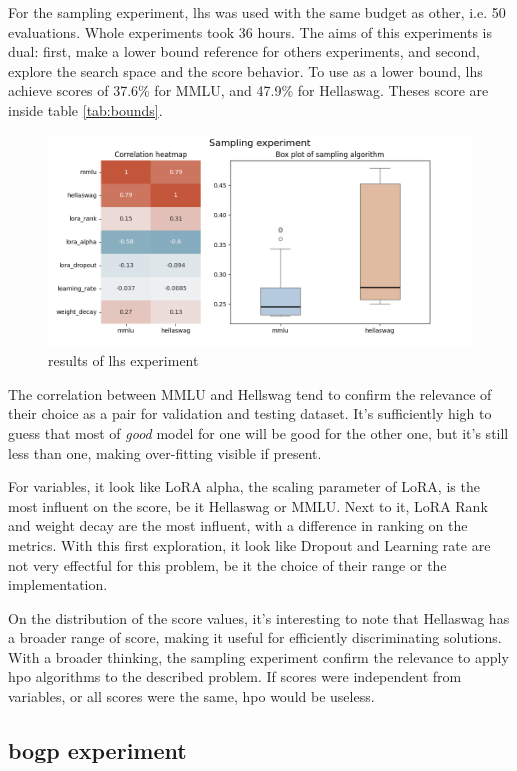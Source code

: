 For the sampling experiment, \acrfull{lhs} was used with the same budget as other, i.e. 50 evaluations. Whole experiments took 36 hours. The aims of this experiments is dual: first, make a lower bound reference for others experiments, and second, explore the search space and the score behavior. To use as a lower bound, \acrshort{lhs} achieve scores of 37.6\% for MMLU, and 47.9\% for Hellaswag. Theses score are inside table \ref{tab:bounds}.

\begin{figure}
    \centering
    \includegraphics[width=0.6\linewidth]{assets/img/chap_4/experiments/plots/sampling/lhs.png}
    \caption{results of \acrlong{lhs} experiment}
    \label{fig:lhs_exp}
\end{figure}

The correlation between MMLU and Hellswag tend to confirm the relevance of their choice as a pair for validation and testing dataset. It's sufficiently high to guess that most of \textit{good} model for one will be good for the other one, but it's still less than one, making over-fitting visible if present.

For variables, it look like LoRA alpha, the scaling parameter of LoRA, is the most influent on the score, be it Hellaswag or MMLU. Next to it, LoRA Rank and weight decay are the most influent, with a difference in ranking on the metrics. With this first exploration, it look like Dropout and Learning rate are not very effectful for this problem, be it the choice of their range or the implementation. 

On the distribution of the score values, it's interesting to note that Hellaswag has a broader range of score, making it useful for efficiently discriminating solutions.  With a broader thinking, the sampling experiment confirm the relevance to apply \acrshort{hpo} algorithms to the described problem. If scores were independent from variables, or all scores were the same, \acrshort{hpo} would be useless. 

\subsection{\acrshort{bogp} experiment}
\label{sec:bo_exp}

